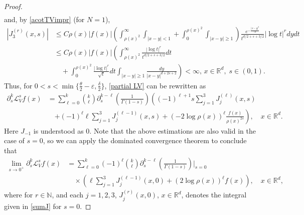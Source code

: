 \documentclass[10pt, a4paper, reqno]{amsart}
\theoremstyle{definition}
\theoremstyle{remark}
\numberwithin{equation}{section}
\begin{document}
\begin{proof}
\begin{align*}
\end{align*}
and, by \eqref{acotTVimpr} (for $N=1$),
\begin{align*}
|J_3^{(r)}(x,s)|&\leq C\rho (x)|f(x)|\left(\!\int_{\rho (x)^2}^\infty\!\!\int_{|x-y|<1}+\! \int_0^{\rho (x)^2}\!\!\int_{|x-y|\geq 1}\right)\frac{e^{-\frac{|x-y|^2}{5t}}}{t^{d/2+s+3/2}}|\log t|^rdydt\\
&\leq C\rho (x)|f(x)|\left(\int_{\rho (x)^2}^\infty \frac{|\log t|^r}{t^{d/2+s+3/2}}dt\right.\\
&\left.\quad +\int_0^{\rho (x)^2}\frac{|\log t|^r}{\sqrt{t}}dt\int_{|x-y|\geq 1}\frac{dy}{|x-y|^{d+2s+2}}\right)<\infty ,\, x\in \mathbb R^d,\;s\in (0,1).
\end{align*}
Thus, for $0<s<\min\{\tfrac{\theta}{2}-\varepsilon,\tfrac{\delta}{2}\}$, \eqref{partial LV} can be rewritten as
\begin{align*}
\partial _s^k\mathcal L_V^sf(x)&=\sum_{\ell =0}^k\binom{k}{\ell }\partial_s^{k-\ell }\left(\frac{1}{\Gamma (1-s)}\right)\left((-1)^{\ell+1} s\sum_{j=1}^3J_j^{(\ell)}(x,s)\right.\nonumber\\
&\quad \left.+(-1)^{\ell}\ell \sum_{j=1}^3J_j^{(\ell -1)}(x,s)+(-2\log \rho (x))^\ell \frac{f(x)}{\rho (x)^{2s}}\right),\quad x\in \mathbb R^d.
\end{align*}
Here $J_{-1}$ is understood as $0$. Note that the above estimations are also valid in the case of $s=0$, so we can apply the dominated convergence theorem to conclude that
\begin{align}\label{derivLs}
\lim_{s\rightarrow 0^+}\partial _s^k\mathcal L_V^sf(x)&=\sum_{\ell =0}^k(-1)^\ell \binom{k}{\ell }\partial_s^{k-\ell }\left(\frac{1}{\Gamma (1-s)}\right)\Big|_{s=0}\nonumber\\
&\quad \times \left(\ell \sum_{j=1}^3J_j^{(\ell -1)}(x,0)+(2\log \rho(x))^\ell f(x)\right),\quad x\in \mathbb R^d,
\end{align}
where for $r\in \mathbb N$, and each $j=1,2, 3$, $J_j^{(r)}(x,0)$, $x\in \mathbb R^d$, denotes the integral given in \eqref{sumJ} for $s=0$. 
\end{proof}
\end{document}
